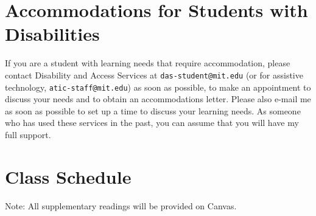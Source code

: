 \documentclass[letterpaper]{infinity_syllabus} %
\begin{document}
\vspace{0.5cm}
\section{Accommodations for Students with Disabilities}

If you are a student with learning needs that require accommodation, please contact Disability and Access Services at \texttt{das-student@mit.edu} (or for assistive technology, \texttt{atic-staff@mit.edu}) as soon as possible, to make an appointment to discuss your needs and to obtain an accommodations letter.
Please also e-mail me as soon as possible to set up a time to discuss your learning needs.
As someone who has used these services in the past, you can assume that you will have my full support.


\newpage
\makeFullPage
\section{Class Schedule}
  \vspace{.2in}

Note: All supplementary readings will be provided on Canvas.\\
\end{document}
